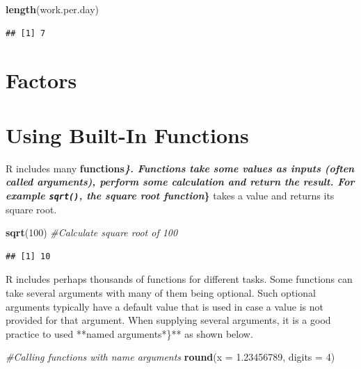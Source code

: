 \documentclass[]{krantz}
\makeatletter
\newenvironment{Shaded}{\begin{snugshade}}{\end{snugshade}}
\newcommand{\KeywordTok}[1]{\textcolor[rgb]{0.27,0.27,0.27}{\textbf{#1}}}
\newcommand{\DataTypeTok}[1]{\textcolor[rgb]{0.27,0.27,0.27}{#1}}
\newcommand{\DecValTok}[1]{\textcolor[rgb]{0.06,0.06,0.06}{#1}}
\newcommand{\FloatTok}[1]{\textcolor[rgb]{0.06,0.06,0.06}{#1}}
\newcommand{\CommentTok}[1]{\textcolor[rgb]{0.37,0.37,0.37}{\textit{#1}}}
\newcommand{\NormalTok}[1]{#1}
\newenvironment{kframe}{%
\medskip{}
\setlength{\fboxsep}{.8em}
 \def\at@end@of@kframe{}%
 \ifinner\ifhmode%
  \def\at@end@of@kframe{\end{minipage}}%
  \begin{minipage}{\columnwidth}%
 \fi\fi%
 \def\FrameCommand##1{\hskip\@totalleftmargin \hskip-\fboxsep
 \colorbox{shadecolor}{##1}\hskip-\fboxsep
     \hskip-\linewidth \hskip-\@totalleftmargin \hskip\columnwidth}%
 \MakeFramed {\advance\hsize-\width
   \@totalleftmargin\z@ \linewidth\hsize
   \@setminipage}}%
 {\par\unskip\endMakeFramed%
 \at@end@of@kframe}
\renewenvironment{Shaded}{\begin{kframe}}{\end{kframe}}
\makeatother
\begin{document}
\begin{Shaded}
\begin{Highlighting}[]
\KeywordTok{length}\NormalTok{(work.per.day)}
\end{Highlighting}
\end{Shaded}

\begin{verbatim}
## [1] 7
\end{verbatim}

\section{Factors}\label{factors}

\section{Using Built-In Functions}\label{using-built-in-functions}

R includes many \textbf{functions\emph{\}\textbf{. Functions take some
values as inputs (often called }arguments\textbf{), perform some
calculation and return the result. For example \texttt{sqrt()}, the
}square root function}\}} takes a value and returns its square root.

\begin{Shaded}
\begin{Highlighting}[]
\KeywordTok{sqrt}\NormalTok{(}\DecValTok{100}\NormalTok{) }\CommentTok{#Calculate square root of 100}
\end{Highlighting}
\end{Shaded}

\begin{verbatim}
## [1] 10
\end{verbatim}

R includes perhaps thousands of functions for different tasks. Some
functions can take several arguments with many of them being optional.
Such optional arguments typically have a default value that is used in
case a value is not provided for that argument. When supplying several
arguments, it is a good practice to used **named arguments*\}** as shown
below.

\begin{Shaded}
\begin{Highlighting}[]
\CommentTok{#Calling functions with name arguments}
\KeywordTok{round}\NormalTok{(}\DataTypeTok{x =} \FloatTok{1.23456789}\NormalTok{, }\DataTypeTok{digits =} \DecValTok{4}\NormalTok{) }
\end{Highlighting}
\end{Shaded}
\end{document}

